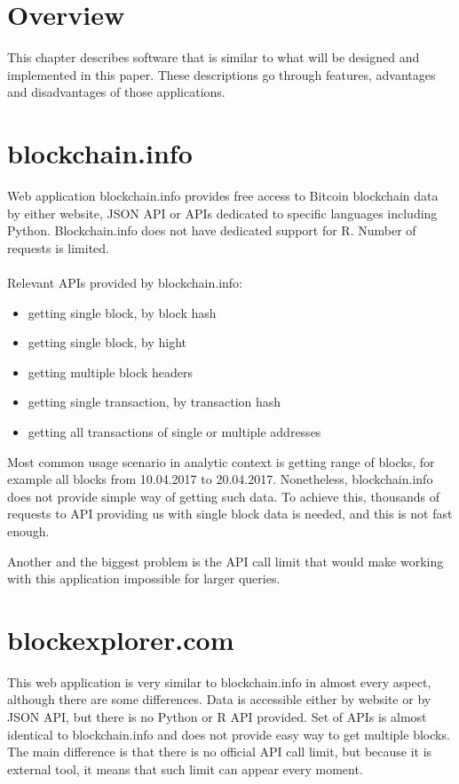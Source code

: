 \documentclass[12pt, en, eng, oneside, final]{mgr}
\begin{document}
\section{Overview}
This chapter describes software that is similar to what will be designed and implemented in this paper. These descriptions go through features, advantages and disadvantages of those applications. 

\section{blockchain.info}

Web application blockchain.info \cite{blokchain.info} provides free access to Bitcoin blockchain data by either website, JSON API or APIs dedicated to specific languages including Python. Blockchain.info does not have dedicated support for R. Number of requests is limited.
\\
\\
Relevant APIs provided by blockchain.info:
\begin{itemize}
\item
getting single block, by block hash
\item
getting single block, by hight
\item
getting multiple block headers
\item
getting single transaction, by transaction hash
\item
getting all transactions of single or multiple addresses


\end{itemize}

Most common usage scenario in analytic context is getting range of blocks, for example all blocks from 10.04.2017 to 20.04.2017. Nonetheless, blockchain.info does not provide simple way of getting such data. To achieve this, thousands of requests to API providing us with single block data is needed, and this is not fast enough.

Another and the biggest problem is the API call limit that would make working with this application impossible for larger queries.

\section{blockexplorer.com}

This web application \cite{blockexpolrer} is very similar to blockchain.info in almost every aspect, although there are some differences. Data is accessible either by website or by JSON API, but there is no Python or R API provided. Set of APIs is almost identical to blockchain.info and does not provide easy way to get multiple blocks. The main difference is that there is no official API call limit, but because it is external tool, it means that such limit can appear every moment.
\end{document}
